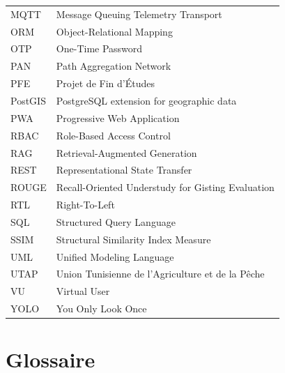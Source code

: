 \begin{longtable}{lp{10cm}}
MQTT & Message Queuing Telemetry Transport \\
ORM & Object-Relational Mapping \\
OTP & One-Time Password \\
PAN & Path Aggregation Network \\
PFE & Projet de Fin d'Études \\
PostGIS & PostgreSQL extension for geographic data \\
PWA & Progressive Web Application \\
RBAC & Role-Based Access Control \\
RAG & Retrieval-Augmented Generation \\
REST & Representational State Transfer \\
ROUGE & Recall-Oriented Understudy for Gisting Evaluation \\
RTL & Right-To-Left \\
SQL & Structured Query Language \\
SSIM & Structural Similarity Index Measure \\
UML & Unified Modeling Language \\
UTAP & Union Tunisienne de l'Agriculture et de la Pêche \\
VU & Virtual User \\
YOLO & You Only Look Once \\
\bottomrule
\end{longtable}

\chapter*{Glossaire}

